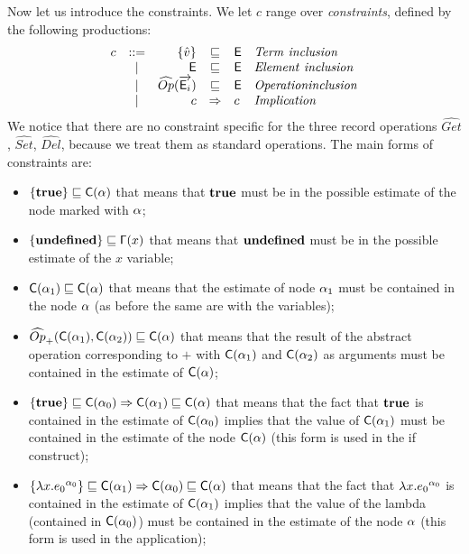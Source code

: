 Now let us introduce the constraints. We let $c$ range over \emph{constraints}, defined by the following productions:
\[
\begin{array}{lcrcll}
c & ::= &\{\vat\} & \sqsubseteq & \El & \mathit{Term\ inclusion}\\
& | & \El & \sqsubseteq & \El & \mathit{Element\ inclusion} \\
& | & \widehat{Op}(\vec{\El_i}) & \sqsubseteq & \El & \mathit{Operation inclusion}\\
& | & c & \Rightarrow & c & \mathit{Implication}\\
\end{array}
\]
We notice that there are no constraint specific for the three record operations $\widehat{Get}$, $\widehat{Set}$, $\widehat{Del}$, because we treat them as standard operations.
The main forms of constraints are:
\begin{itemize}
\item $\{\mathbf{true}\} \sqsubseteq \mathsf{C}(\alpha) $ that means that $\mathbf{true}$ must be in the possible estimate of the node marked with $\alpha$;
\item $\{\mathbf{undefined}\} \sqsubseteq \mathsf{\Gamma}(x) $ that means that $\mathbf{undefined}$ must be in the possible estimate of the $x$ variable;
\item $\mathsf{C}(\alpha_1) \sqsubseteq \mathsf{C}(\alpha) $  that means that the estimate of node $\alpha_1$ must be contained in the node $\alpha$ (as before the same are with the variables);
\item $\widehat{Op}_+(\mathsf{C}(\alpha_1), \mathsf{C}(\alpha_2))\sqsubseteq \mathsf{C}(\alpha)$  that means that the result of the abstract operation corresponding to $+$ with $\mathsf{C}(\alpha_1)$ and $\mathsf{C}(\alpha_2)$ as arguments must be contained in the estimate of $\mathsf{C}(\alpha)$;
\item $\{\mathbf{true}\}\sqsubseteq \mathsf{C}(\alpha_0) \Rightarrow \mathsf{C}(\alpha_1) \sqsubseteq \mathsf{C}(\alpha)$ that means that the fact that $\mathbf{true}$ is contained in the estimate of $\mathsf{C}(\alpha_0)$ implies that the value of $\mathsf{C}(\alpha_1)$ must be contained in the estimate of the node $\mathsf{C}(\alpha)$ (this form is used in the if construct);
\item $\{\lambda x.{e_0}^{\alpha_0}\}\sqsubseteq \mathsf{C}(\alpha_1) \Rightarrow \mathsf{C}(\alpha_0) \sqsubseteq \mathsf{C}(\alpha)$ that means that the fact that $\lambda x.{e_0}^{\alpha_0}$ is contained in the estimate of $\mathsf{C}(\alpha_1)$ implies that the value of the lambda (contained in $\mathsf{C}(\alpha_0)$) must be contained in the estimate of the node $\alpha$ (this form is used in the application);
\end{itemize}

